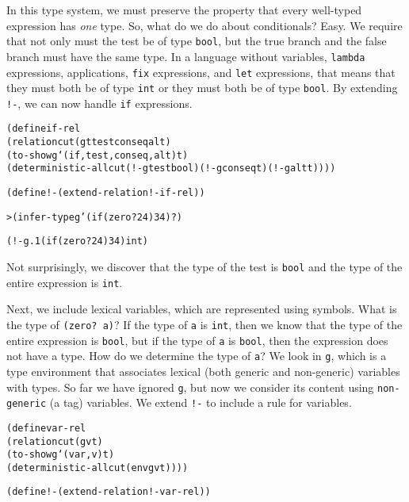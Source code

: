 In this type system, we must preserve the property that every
well-typed expression has \emph{one} type.  So, what do we do about
conditionals?  Easy.  We require that not only must the test be of
type \texttt{bool}, but the true branch and the false branch must
have the same type.  In a language without variables, \texttt{lambda}
expressions, applications, \texttt{fix} expressions, and \texttt{let}
expressions, that means that they must both be of type \texttt{int}
or they must both be of type \texttt{bool}.  By extending
\texttt{!-}, we can now handle \texttt{if} expressions.

\begin{alltt}
(define if-rel
  (relation cut (g t test conseq alt)
    (to-show g `(if ,test ,conseq ,alt) t)
    (deterministic-all cut (!- g test bool) (!- g conseq t) (!- g alt t))))
\end{alltt}

\begin{alltt}
(define !- (extend-relation !- if-rel))
\end{alltt}

\begin{alltt}
> (infer-type g '(if (zero? 24) 3 4) ?)

(!- g.1 (if (zero? 24) 3 4) int)
\end{alltt}

\noindent
Not surprisingly, we discover that the type of the test is \texttt{bool}
and the type of the entire expression is \texttt{int}.

Next, we include lexical variables, which are represented using
symbols.  What is the type of \texttt{(zero? a)}?  If the type of
\texttt{a} is \texttt{int}, then we know that the type of the entire
expression is \texttt{bool}, but if the type of \texttt{a} is
\texttt{bool}, then the expression does not have a type.  How do we
determine the type of \texttt{a}?  We look in \texttt{g}, which is a
type environment that associates lexical (both generic and
non-generic) variables with types.  So far we have ignored \texttt{g},
but now we consider its content using \texttt{non-generic} (a tag)
variables.  We extend \texttt{!-} to include a rule for variables.

\begin{alltt}
(define var-rel
  (relation cut (g v t)
    (to-show g `(var ,v) t)
    (deterministic-all cut (env g v t))))

(define !- (extend-relation !- var-rel))
\end{alltt}


